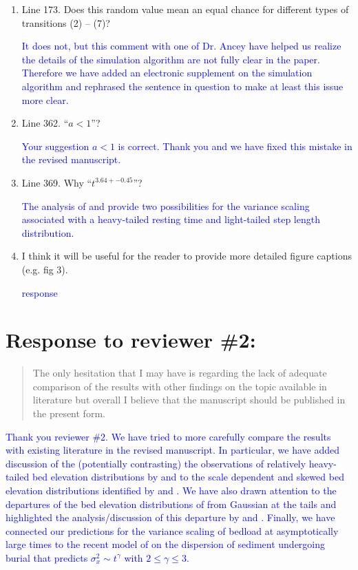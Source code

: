 \documentclass[11pt]{article}
\begin{document}
\begin{enumerate}
\item Line 173. Does this random value mean an equal chance for different types of transitions
(2) – (7)?

\textcolor{blue}{It does not, but this comment with one of Dr. Ancey have helped us realize the details of the simulation algorithm are not fully clear in the paper. Therefore we have added an electronic supplement on the simulation algorithm and rephrased the sentence in question to make at least this issue more clear.}

\item Line 362. “$a<1$”?

\textcolor{blue}{Your suggestion $a<1$ is correct. Thank you and we have fixed this mistake in the revised manuscript.}

\item Line 369. Why “$t^{3.64+-0.45}$”?

\textcolor{blue}{The analysis of \citet{Weeks1996} and \citet{Weeks1998} provide two possibilities for the variance scaling associated with a heavy-tailed resting time and light-tailed step length distribution.}

\item I think it will be useful for the reader to provide more detailed figure captions (e.g. fig 3).

\textcolor{blue}{response}


\end{enumerate}

\section*{Response to reviewer \#2:}

\begin{quote}
The only hesitation that I may have is regarding the lack of adequate comparison of the results with other findings on the topic available in literature but overall I believe that the manuscript should be published in the present form.
\end{quote}

\textcolor{blue}{
Thank you reviewer \#2. We have tried to more carefully compare the results with existing literature in the revised manuscript. In particular, we have added discussion of the (potentially contrasting) the observations of relatively heavy-tailed bed elevation distributions by \citet{Aberle2006} and to the scale dependent and skewed bed elevation distributions identified by \citet{Singh2009} and \citet{Singh2012}. We have also drawn attention to the departures of the bed elevation distributions of \citet{Wong2007} from Gaussian at the tails and highlighted the analysis/discussion of this departure by \citet{Pelosi2014a} and \citet{Pelosi2016}. Finally, we have connected our predictions for the variance scaling of bedload at asymptotically large times to the recent model of \citet{Wu2019} on the dispersion of sediment undergoing burial that predicts $\sigma_x^2 \sim t^\gamma$ with $2\leq \gamma \leq 3$. }
\end{document}
